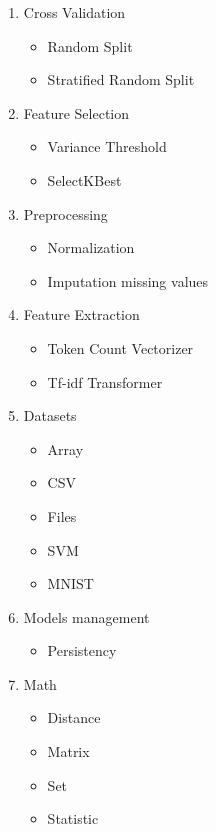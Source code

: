 \begin{enumerate}
\begin{itemize}
\end{itemize}
\item Cross Validation
\begin{itemize}
\item Random Split
\item Stratified Random Split
\end{itemize}
\item Feature Selection
\begin{itemize}
\item Variance Threshold
\item SelectKBest
\end{itemize}
\item Preprocessing
\begin{itemize}
\item Normalization
\item Imputation missing values
\end{itemize}
\item Feature Extraction
\begin{itemize}
\item Token Count Vectorizer
\item Tf-idf Transformer
\end{itemize}
\item Datasets
\begin{itemize}
\item Array
\item CSV
\item Files
\item SVM
\item MNIST
\end{itemize}
\item Models management
\begin{itemize}
\item Persistency
\end{itemize}
\item Math
\begin{itemize}
\item Distance
\item Matrix
\item Set
\item Statistic
\end{itemize}
\end{enumerate}


